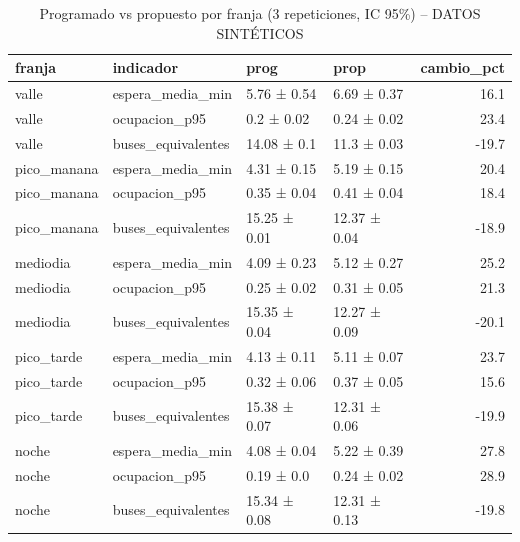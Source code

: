 \begin{table}
\caption{Programado vs propuesto por franja (3 repeticiones, IC 95\%) -- DATOS SINTÉTICOS}
\begin{tabular}{llllr}
\toprule
franja & indicador & prog & prop & cambio_pct \\
\midrule
valle & espera_media_min & 5.76 ± 0.54 & 6.69 ± 0.37 & 16.1 \\
valle & ocupacion_p95 & 0.2 ± 0.02 & 0.24 ± 0.02 & 23.4 \\
valle & buses_equivalentes & 14.08 ± 0.1 & 11.3 ± 0.03 & -19.7 \\
pico_manana & espera_media_min & 4.31 ± 0.15 & 5.19 ± 0.15 & 20.4 \\
pico_manana & ocupacion_p95 & 0.35 ± 0.04 & 0.41 ± 0.04 & 18.4 \\
pico_manana & buses_equivalentes & 15.25 ± 0.01 & 12.37 ± 0.04 & -18.9 \\
mediodia & espera_media_min & 4.09 ± 0.23 & 5.12 ± 0.27 & 25.2 \\
mediodia & ocupacion_p95 & 0.25 ± 0.02 & 0.31 ± 0.05 & 21.3 \\
mediodia & buses_equivalentes & 15.35 ± 0.04 & 12.27 ± 0.09 & -20.1 \\
pico_tarde & espera_media_min & 4.13 ± 0.11 & 5.11 ± 0.07 & 23.7 \\
pico_tarde & ocupacion_p95 & 0.32 ± 0.06 & 0.37 ± 0.05 & 15.6 \\
pico_tarde & buses_equivalentes & 15.38 ± 0.07 & 12.31 ± 0.06 & -19.9 \\
noche & espera_media_min & 4.08 ± 0.04 & 5.22 ± 0.39 & 27.8 \\
noche & ocupacion_p95 & 0.19 ± 0.0 & 0.24 ± 0.02 & 28.9 \\
noche & buses_equivalentes & 15.34 ± 0.08 & 12.31 ± 0.13 & -19.8 \\
\bottomrule
\end{tabular}
\end{table}

